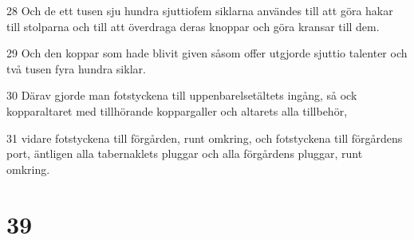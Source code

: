 \par 28 Och de ett tusen sju hundra sjuttiofem siklarna användes till att göra hakar till stolparna och till att överdraga deras knoppar och göra kransar till dem.
\par 29 Och den koppar som hade blivit given såsom offer utgjorde sjuttio talenter och två tusen fyra hundra siklar.
\par 30 Därav gjorde man fotstyckena till uppenbarelsetältets ingång, så ock kopparaltaret med tillhörande koppargaller och altarets alla tillbehör,
\par 31 vidare fotstyckena till förgården, runt omkring, och fotstyckena till förgårdens port, äntligen alla tabernaklets pluggar och alla förgårdens pluggar, runt omkring.

\chapter{39}

